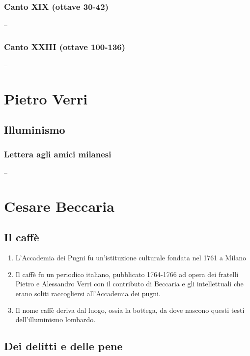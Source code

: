 \documentclass{article}
\begin{document}
\newpage
\subsubsection{Canto XIX (ottave 30-42)}

--

\newpage
\subsubsection{Canto XXIII (ottave 100-136)}

--

\newpage
\section{Pietro Verri}
\subsection{Illuminismo}
\subsubsection{Lettera agli amici milanesi}

--

\newpage
\section{Cesare Beccaria}

\subsection{Il caffè}

\begin{enumerate}
    \item L'Accademia dei Pugni fu un'istituzione culturale fondata nel 1761 a Milano
    \item Il caffè fu un periodico italiano, pubblicato 1764-1766 ad opera dei fratelli Pietro e Alessandro Verri con il contributo di Beccaria e gli intellettuali che erano soliti raccogliersi all'Accademia dei pugni.
    \item Il nome caffè deriva dal luogo, ossia la bottega, da dove nascono questi testi dell'illuminismo lombardo.
\end{enumerate}

\subsection{Dei delitti e delle pene}
\end{document}
